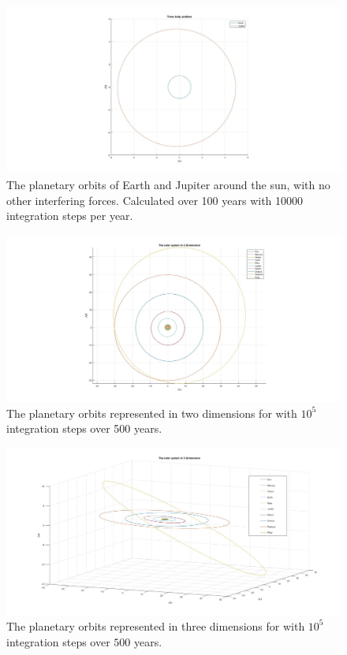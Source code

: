 \documentclass[10pt,a4paper]{article}
\begin{document}
\begin{figure} [h]  

\centerline{\includegraphics[scale=0.40]{ThreeBody.jpg}}
\caption{The planetary orbits of Earth and Jupiter around the sun, with no other interfering forces. Calculated over 100 years with 10000 integration steps per year.}

\end{figure}



\begin{figure} [h]  

\centerline{\includegraphics[scale=0.40]{2dsolsys.jpg}}
\caption{The planetary orbits represented in two dimensions for with $10^5$ integration steps over 500 years.}

\end{figure}


\begin{figure} [h]

\centerline{\includegraphics[scale=0.35]{3dsolsys.jpg}}
\caption{The planetary orbits represented in three dimensions for with $10^5$ integration steps over $500$ years.}

\end{figure}
\end{document}
